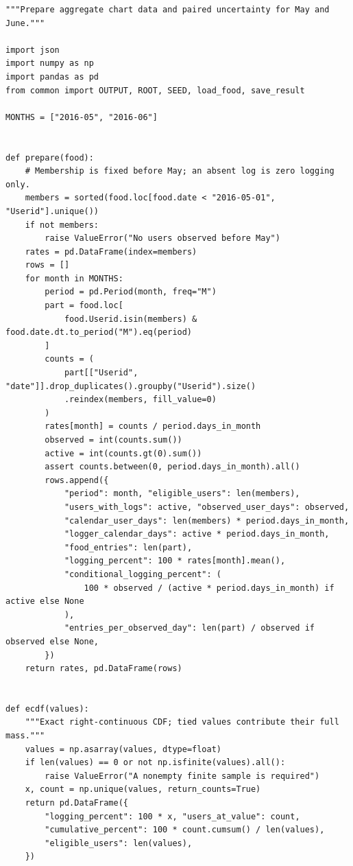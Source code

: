 \begin{Verbatim}[breaklines,breakanywhere,fontsize=\small]
"""Prepare aggregate chart data and paired uncertainty for May and June."""

import json
import numpy as np
import pandas as pd
from common import OUTPUT, ROOT, SEED, load_food, save_result

MONTHS = ["2016-05", "2016-06"]


def prepare(food):
    # Membership is fixed before May; an absent log is zero logging only.
    members = sorted(food.loc[food.date < "2016-05-01", "Userid"].unique())
    if not members:
        raise ValueError("No users observed before May")
    rates = pd.DataFrame(index=members)
    rows = []
    for month in MONTHS:
        period = pd.Period(month, freq="M")
        part = food.loc[
            food.Userid.isin(members) & food.date.dt.to_period("M").eq(period)
        ]
        counts = (
            part[["Userid", "date"]].drop_duplicates().groupby("Userid").size()
            .reindex(members, fill_value=0)
        )
        rates[month] = counts / period.days_in_month
        observed = int(counts.sum())
        active = int(counts.gt(0).sum())
        assert counts.between(0, period.days_in_month).all()
        rows.append({
            "period": month, "eligible_users": len(members),
            "users_with_logs": active, "observed_user_days": observed,
            "calendar_user_days": len(members) * period.days_in_month,
            "logger_calendar_days": active * period.days_in_month,
            "food_entries": len(part),
            "logging_percent": 100 * rates[month].mean(),
            "conditional_logging_percent": (
                100 * observed / (active * period.days_in_month) if active else None
            ),
            "entries_per_observed_day": len(part) / observed if observed else None,
        })
    return rates, pd.DataFrame(rows)


def ecdf(values):
    """Exact right-continuous CDF; tied values contribute their full mass."""
    values = np.asarray(values, dtype=float)
    if len(values) == 0 or not np.isfinite(values).all():
        raise ValueError("A nonempty finite sample is required")
    x, count = np.unique(values, return_counts=True)
    return pd.DataFrame({
        "logging_percent": 100 * x, "users_at_value": count,
        "cumulative_percent": 100 * count.cumsum() / len(values),
        "eligible_users": len(values),
    })



\end{Verbatim}
